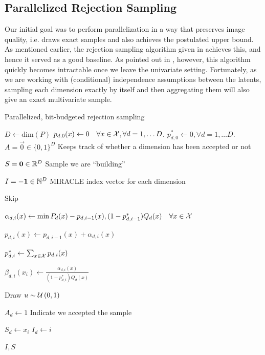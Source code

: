 \subsection{Parallelized Rejection Sampling}
\par
Our initial goal was to perform parallelization in a way that preserves image
quality, i.e. draws exact samples and also achieves the postulated upper bound.
As mentioned earlier, the rejection sampling algorithm given in
\cite{harsha2007communication} achieves this, and hence it served as a good
baseline. As pointed out in \cite{havasi2018minimal}, however, this algorithm
quickly becomes intractable once we leave the univariate setting. Fortunately, as we
are working with (conditional) independence assumptions between the latents,
sampling each dimension exactly by itself and then aggregating them will also
give an exact multivariate sample.
\begin{algorithm}
  \caption{Parallelized, bit-budgeted rejection sampling}
  \label{alg:multivariate_rej_samp}
  \begin{algorithmic}
    \State $D \gets \text{dim}(P)$
    \State $p_{d, 0}(x) \gets 0 \quad \forall x \in \mathcal{X}, \forall d = 1,\hdots D$.
    \State $p_{d, 0}^* \gets 0, \forall d = 1,\hdots D$.
    \State $A = \vec{0} \in \{0, 1\}^D$
    \Comment Keeps track of whether a dimension has been accepted or not

    \State $S = \mathbf{0} \in \mathbb{R}^D$
    \Comment Sample we are ``building''

    \State $I = -\mathbf{1} \in \mathbb{N}^D$
    \Comment MIRACLE index vector for each dimension




    \State Skip

    \EndIf


    \State
    $\alpha_{d, i}(x) \gets \min{P_d(x) - p_{d, i - 1}(x), (1 - p_{d, i - 1}^*)Q_d(x)}\quad
    \forall x \in \mathcal{X}$

    \State $p_{d, i}(x) \gets p_{d, i - 1}(x) + \alpha_{d, i}(x)$
    
    \State $p_{d, i}^* \gets \sum_{x \in \mathcal{X}}p_{d, i}(x)$

    \State $\beta_{d, i}(x_i) \gets \frac{\alpha_{d, i}(x)}{(1 - p_{d, i}^*)Q_d(x)}$

    \State Draw $u \sim \mathcal{U}\left( 0, 1 \right)$


    \State $A_d \gets 1$
    \Comment Indicate we accepted the sample

    \State $S_d \gets x_i$
    \State $I_d \gets i$

    \EndIf
    
    \EndFor
    \EndFor

    \State\Return $I, S$
    \EndProcedure
  \end{algorithmic}
\end{algorithm}

